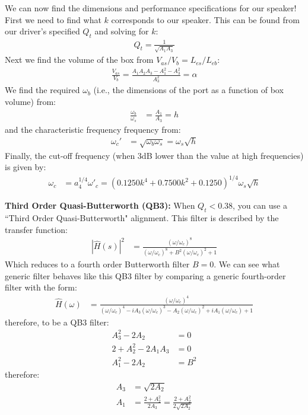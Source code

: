 \documentclass[10pt,letterpaper]{book}
\begin{document}
We can now find the dimensions and performance specifications for our speaker! First we need to find what $k$ corresponds to our speaker. This can be found from our driver's specified $Q_t$ and solving for $k$:
\begin{align}
Q_t=\frac{1}{\sqrt{A_1A_3}}
\end{align}
Next we find the volume of the box from $V_{as}/V_{b}=L_{es}/L_{eb}$:
\begin{align}
\frac{V_{as}}{V_{b}}=\frac{A_1A_2A_3-A_1^2-A_3^2}{A_3^2}=\alpha
\end{align}
We find the required $\omega_b$ (i.e., the dimensions of the port as a function of box volume) from:
\begin{align}
\frac{\omega_b}{\omega_s}&=\frac{A_1}{A_3}=h
\end{align}
and the characteristic frequency frequency from:
\begin{align}
\omega_c'&=\sqrt{\omega_b\omega_s}=\omega_s\sqrt{h}
\end{align}
Finally, the cut-off frequency (when 3dB lower than the value at high frequencies) is given by:
\begin{align}
\omega_c &=a_4^{1/4}\omega'_c=(0.1250k^4+0.7500k^2+0.1250)^{1/4}\omega_s\sqrt{h}
\end{align}

\textbf{Third Order Quasi-Butterworth (QB3):} When $Q_t<0.38$, you can use a ``Third Order Quasi-Butterworth" alignment. This filter is described by the transfer function:
\begin{align}
\left| \hat{H}(s) \right|^2 &=\frac{(\omega/\omega_c)^8}{(\omega/\omega_c)^8+B^2(\omega/\omega_c)^2+1}
\end{align}
Which reduces to a fourth order Butterworth filter $B=0$. We can see what generic filter behaves like this QB3 filter by comparing a generic fourth-order filter with the form:
\begin{align}
\hat{H}(\omega) &=\frac{(\omega/\omega_c)^4}{(\omega/\omega_c)^4-iA_3(\omega/\omega_c)^3-A_2(\omega/\omega_c)^2+iA_1(\omega/\omega_c)+1}
\end{align}
therefore, to be a QB3 filter:
\begin{align}
A_3^2-2 A_2&=0\label{eq:qb3-start}\\
2+A_2^2-2 A_1 A_3&=0\\
A_1^2-2 A_2&=B^2\label{eq:qb3-end}
\end{align}
therefore:
\begin{align}
A_3&=\sqrt{2 A_2}\\
A_1&=\frac{2+A_2^2}{2 A_3}=\frac{2+A_2^2}{2 \sqrt{2 A_2}}
\end{align}
\end{document}
